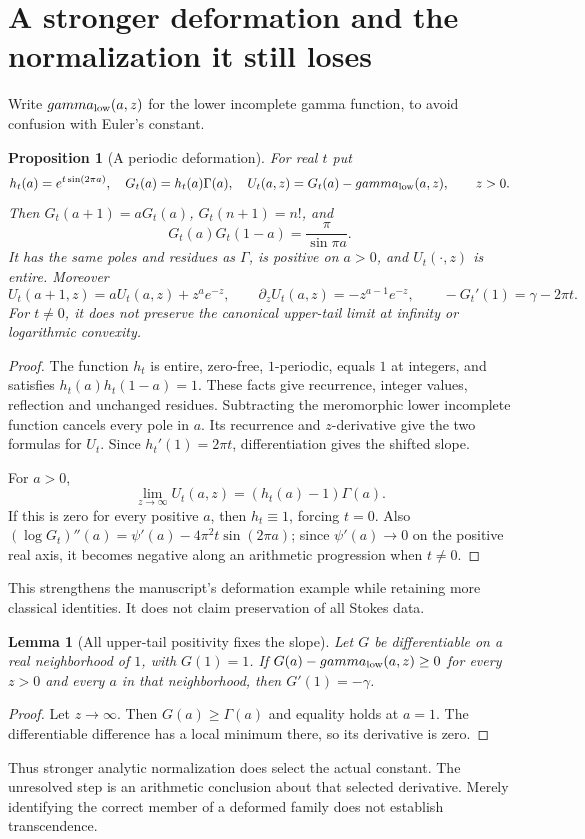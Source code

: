 \documentclass[11pt,a4paper]{article}
\newtheorem{lemma}[theorem]{Lemma}
\newtheorem{proposition}[theorem]{Proposition}
\theoremstyle{definition}
\theoremstyle{remark}
\theoremstyle{plain}
\numberwithin{equation}{section}
\begin{document}
\section{A stronger deformation and the normalization it still loses}
Write $\gamma_{\rm low}(a,z)$ for the lower incomplete gamma function, to avoid confusion with Euler's constant.
\begin{proposition}[A periodic deformation]\label{ra:prop:periodic}
For real $t$ put
\[
 h_t(a)=e^{t\sin(2\pi a)},\quad G_t(a)=h_t(a)\Gamma(a),\quad
 U_t(a,z)=G_t(a)-\gamma_{\rm low}(a,z),\qquad z>0.
\]
Then $G_t(a+1)=aG_t(a)$, $G_t(n+1)=n!$, and
\[
 G_t(a)G_t(1-a)=\frac\pi{\sin\pi a}.
\]
It has the same poles and residues as $\Gamma$, is positive on $a>0$, and $U_t(\cdot,z)$ is entire. Moreover
\[
 U_t(a+1,z)=aU_t(a,z)+z^ae^{-z},\qquad
 \partial_zU_t(a,z)=-z^{a-1}e^{-z},\qquad
 -G_t'(1)=\gamma-2\pi t.
\]
For $t\ne0$, it does not preserve the canonical upper-tail limit at infinity or logarithmic convexity.
\end{proposition}
\begin{proof}
The function $h_t$ is entire, zero-free, $1$-periodic, equals $1$ at integers, and satisfies $h_t(a)h_t(1-a)=1$. These facts give recurrence, integer values, reflection and unchanged residues. Subtracting the meromorphic lower incomplete function cancels every pole in $a$. Its recurrence and $z$-derivative give the two formulas for $U_t$. Since $h_t'(1)=2\pi t$, differentiation gives the shifted slope.

For $a>0$,
\[
 \lim_{z\to\infty}U_t(a,z)=(h_t(a)-1)\Gamma(a).
\]
If this is zero for every positive $a$, then $h_t\equiv1$, forcing $t=0$. Also
$(\log G_t)''(a)=\psi'(a)-4\pi^2t\sin(2\pi a)$; since $\psi'(a)\to0$ on the positive real axis, it becomes negative along an arithmetic progression when $t\ne0$.
\end{proof}
This strengthens the manuscript's deformation example while retaining more classical identities. It does not claim preservation of all Stokes data.

\begin{lemma}[All upper-tail positivity fixes the slope]
Let $G$ be differentiable on a real neighborhood of $1$, with $G(1)=1$. If
$G(a)-\gamma_{\rm low}(a,z)\ge0$ for every $z>0$ and every $a$ in that neighborhood, then $G'(1)=-\gamma$.
\end{lemma}
\begin{proof}
Let $z\to\infty$. Then $G(a)\ge\Gamma(a)$ and equality holds at $a=1$. The differentiable difference has a local minimum there, so its derivative is zero.
\end{proof}
Thus stronger analytic normalization does select the actual constant. The unresolved step is an arithmetic conclusion about that selected derivative. Merely identifying the correct member of a deformed family does not establish transcendence.
\end{document}
